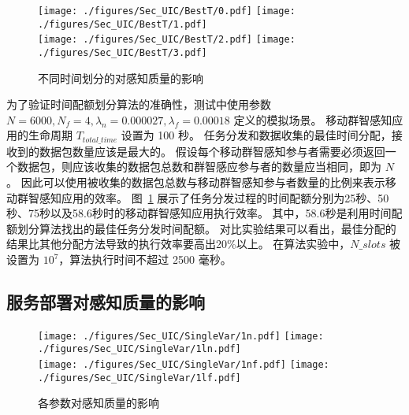 \begin{figure}[!b]
  \centering
  {\texttt{[image: ./figures/Sec\_UIC/BestT/0.pdf]}}
  {\texttt{[image: ./figures/Sec\_UIC/BestT/1.pdf]}}\\
  {\texttt{[image: ./figures/Sec\_UIC/BestT/2.pdf]}}
  {\texttt{[image: ./figures/Sec\_UIC/BestT/3.pdf]}}
  \vspace{-1em}
  \caption{不同时间划分的对感知质量的影响}
  \label{Figure_BestT}
\end{figure}

为了验证时间配额划分算法的准确性，测试中使用参数 $N=6000, N_f=4, \lambda_n = 0.000027, \lambda_f=0.00018$ 定义的模拟场景。
移动群智感知应用的生命周期 $T_{total\_time}$ 设置为 100 秒。
任务分发和数据收集的最佳时间分配，接收到的数据包数量应该是最大的。
假设每个移动群智感知参与者需要必须返回一个数据包，则应该收集的数据包总数和群智感应参与者的数量应当相同，即为 $N$。
因此可以使用被收集的数据包总数与移动群智感知参与者数量的比例来表示移动群智感知应用的效率。
图~\ref{Figure_BestT} 展示了任务分发过程的时间配额分别为25秒、50秒、75秒以及58.6秒时的移动群智感知应用执行效率。
其中，58.6秒是利用时间配额划分算法找出的最佳任务分发时间配额。
对比实验结果可以看出，最佳分配的结果比其他分配方法导致的执行效率要高出20\%以上。
在算法实验中，$N\_slots$ 被设置为 $10^7$，算法执行时间不超过 2500 毫秒。



\subsection{服务部署对感知质量的影响}


\begin{figure}[!b]
  \centering
	{\texttt{[image: ./figures/Sec\_UIC/SingleVar/1n.pdf]}}
	{\texttt{[image: ./figures/Sec\_UIC/SingleVar/1ln.pdf]}}\\
	{\texttt{[image: ./figures/Sec\_UIC/SingleVar/1nf.pdf]}}
	{\texttt{[image: ./figures/Sec\_UIC/SingleVar/1lf.pdf]}}
	\vspace{-1em}
	\caption{各参数对感知质量的影响}
	\label{Figure_SingleValTest}
\end{figure}

